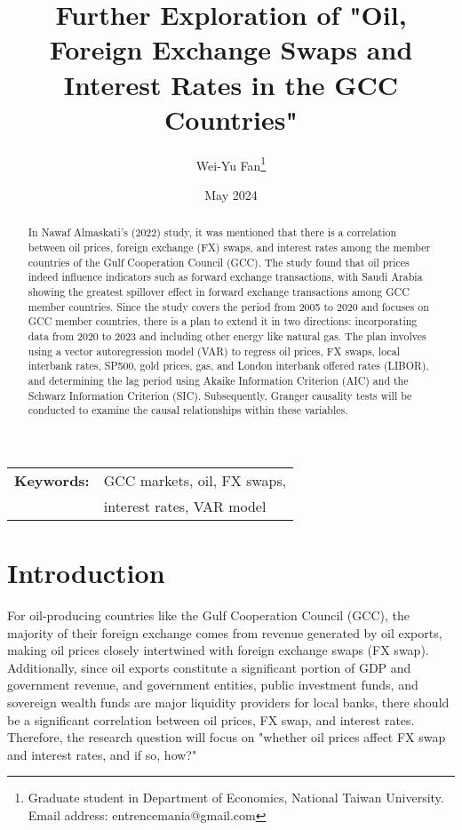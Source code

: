 \documentclass[12pt]{article}
\title{Further Exploration of "Oil, Foreign Exchange Swaps and Interest Rates in the GCC Countries"}
\author{Wei-Yu Fan\thanks{
Graduate student in Department of Economics, National Taiwan University.\\ 
Email address: entrencemania@gmail.com
}
}
\date{May 2024}
\begin{document}
\maketitle
\begin{sloppypar}
\begin{spacing}{0}
\begin{abstract}
\noindent 
In Nawaf Almaskati's (2022) study, it was mentioned that there is a correlation between oil prices, foreign exchange (FX) swaps, and interest rates among the member countries of the Gulf Cooperation Council (GCC). The study found that oil prices indeed influence indicators such as forward exchange transactions, with Saudi Arabia showing the greatest spillover effect in forward exchange transactions among GCC member countries. Since the study covers the period from 2005 to 2020 and focuses on GCC member countries, there is a plan to extend it in two directions: incorporating data from 2020 to 2023 and including other energy like natural gas. The plan involves using a vector autoregression model (VAR) to regress oil prices, FX swaps, local interbank rates, SP500, gold prices, gas, and London interbank offered rates (LIBOR), and determining the lag period using Akaike Information Criterion (AIC) and the Schwarz Information Criterion (SIC). Subsequently, Granger causality tests will be conducted to examine the causal relationships within these variables.
\end{abstract}
\end{spacing}

\begin{tabular}{rl}
    \\
    \textbf{Keywords:} &GCC markets, oil, FX swaps, \\
    &interest rates, VAR model\\
\end{tabular}


\section{Introduction}
For oil-producing countries like the Gulf Cooperation Council (GCC), the majority of their foreign exchange comes from revenue generated by oil exports, making oil prices closely intertwined with foreign exchange swaps (FX swap). Additionally, since oil exports constitute a significant portion of GDP and government revenue, and government entities, public investment funds, and sovereign wealth funds are major liquidity providers for local banks, there should be a significant correlation between oil prices, FX swap, and interest rates. Therefore, the research question will focus on "whether oil prices affect FX swap and interest rates, and if so, how?"


\end{sloppypar}
\end{document}
